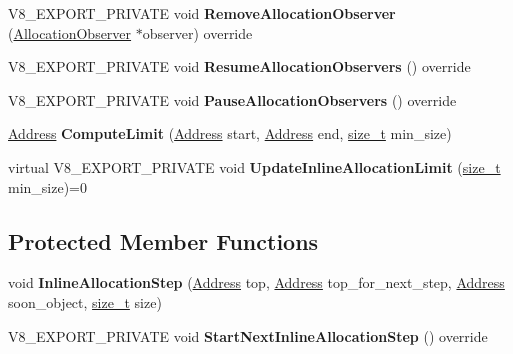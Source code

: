 \begin{DoxyCompactItemize}
\item 
\mbox{\label{classv8_1_1internal_1_1SpaceWithLinearArea_af06c7313b6432e3f5d7d35f110b6072b}} 
V8\+\_\+\+E\+X\+P\+O\+R\+T\+\_\+\+P\+R\+I\+V\+A\+TE void {\bfseries Remove\+Allocation\+Observer} (\mbox{\hyperlink{classv8_1_1internal_1_1AllocationObserver}{Allocation\+Observer}} $\ast$observer) override
\item 
\mbox{\label{classv8_1_1internal_1_1SpaceWithLinearArea_aa13d43eabcc2e4dafc96fe6c9af5231a}} 
V8\+\_\+\+E\+X\+P\+O\+R\+T\+\_\+\+P\+R\+I\+V\+A\+TE void {\bfseries Resume\+Allocation\+Observers} () override
\item 
\mbox{\label{classv8_1_1internal_1_1SpaceWithLinearArea_aa82e154f0c929129195e5c51646ec9dd}} 
V8\+\_\+\+E\+X\+P\+O\+R\+T\+\_\+\+P\+R\+I\+V\+A\+TE void {\bfseries Pause\+Allocation\+Observers} () override
\item 
\mbox{\label{classv8_1_1internal_1_1SpaceWithLinearArea_a2910ecd8e3b503be887bee41731b60fc}} 
\mbox{\hyperlink{classuintptr__t}{Address}} {\bfseries Compute\+Limit} (\mbox{\hyperlink{classuintptr__t}{Address}} start, \mbox{\hyperlink{classuintptr__t}{Address}} end, \mbox{\hyperlink{classsize__t}{size\+\_\+t}} min\+\_\+size)
\item 
\mbox{\label{classv8_1_1internal_1_1SpaceWithLinearArea_a21ec28e3548a0bbdbe24c86f696a22ce}} 
virtual V8\+\_\+\+E\+X\+P\+O\+R\+T\+\_\+\+P\+R\+I\+V\+A\+TE void {\bfseries Update\+Inline\+Allocation\+Limit} (\mbox{\hyperlink{classsize__t}{size\+\_\+t}} min\+\_\+size)=0
\end{DoxyCompactItemize}
\subsection*{Protected Member Functions}
\begin{DoxyCompactItemize}
\item 
\mbox{\label{classv8_1_1internal_1_1SpaceWithLinearArea_a6652320014fa945db2e6e13d3cf7c16f}} 
void {\bfseries Inline\+Allocation\+Step} (\mbox{\hyperlink{classuintptr__t}{Address}} top, \mbox{\hyperlink{classuintptr__t}{Address}} top\+\_\+for\+\_\+next\+\_\+step, \mbox{\hyperlink{classuintptr__t}{Address}} soon\+\_\+object, \mbox{\hyperlink{classsize__t}{size\+\_\+t}} size)
\item 
\mbox{\label{classv8_1_1internal_1_1SpaceWithLinearArea_a85030a6985d1ca020c25badeb46de07c}} 
V8\+\_\+\+E\+X\+P\+O\+R\+T\+\_\+\+P\+R\+I\+V\+A\+TE void {\bfseries Start\+Next\+Inline\+Allocation\+Step} () override
\end{DoxyCompactItemize}
